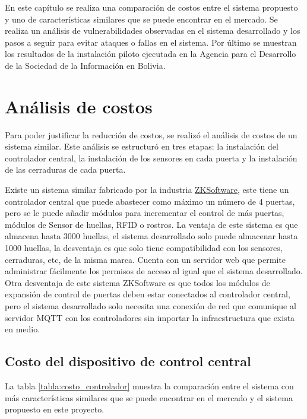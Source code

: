\documentclass[../principal]{subfiles}
\begin{document}
\espacio

  En este capítulo se realiza una comparación de costos entre el sistema propuesto y uno de características similares que se puede encontrar en el mercado. Se realiza un análisis de vulnerabilidades observadas en el sistema desarrollado y los pasos a seguir para evitar ataques o fallas en el sistema. Por último se muestran los resultados de la instalación piloto ejecutada en la Agencia para el Desarrollo de la Sociedad de la Información en Bolivia.

  \section{Análisis de costos}

  Para poder justificar la reducción de costos, se realizó el análisis de costos de un sistema similar. Este análisis se estructuró en tres etapas: la instalación del controlador central, la instalación de los sensores en cada puerta y la instalación de las cerraduras de cada puerta.

  Existe un sistema similar fabricado por la industria \href{http://www.zksoftware.com.ar/control_accesos.php}{ZKSoftware}, este tiene un controlador central que puede abastecer como máximo un número de 4 puertas, pero se le puede añadir módulos para incrementar el control de más puertas, módulos de Sensor de huellas, RFID o rostros. La ventaja de este sistema es que almacena hasta 3000 huellas, el sistema desarrollado solo puede almacenar hasta 1000 huellas, la desventaja es que solo tiene compatibilidad con los sensores, cerraduras, etc, de la misma marca. Cuenta con un servidor web que permite administrar fácilmente los permisos de acceso al igual que el sistema desarrollado. Otra desventaja de este sistema ZKSoftware es que todos los módulos de expansión de control de puertas deben estar conectados al controlador central, pero el sistema desarrollado solo necesita una conexión de red que comunique al servidor MQTT con los controladores sin importar la infraestructura que exista en medio.

  \subsection{Costo del dispositivo de control central}

  La tabla \ref{tabla:costo_controlador} muestra la comparación entre el sistema con más características similares que se puede encontrar en el mercado y el sistema propuesto en este proyecto.
\end{document}
